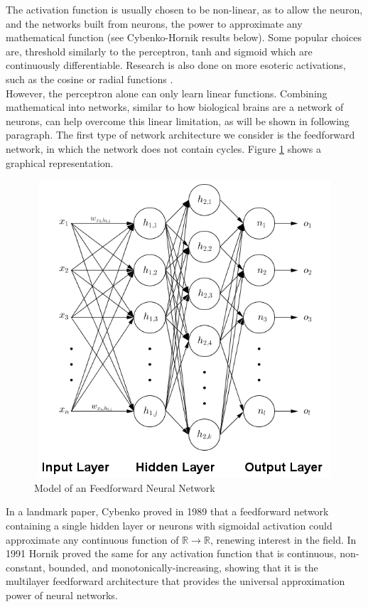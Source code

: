 \documentclass[12pt,oneside]{CUNY_CS_PhD}
\begin{document}
The activation function is usually chosen to be non-linear, as to allow the neuron, and the networks built from neurons, the power to approximate any mathematical function (see Cybenko-Hornik results below).
Some popular choices are, threshold similarly to the perceptron, tanh and sigmoid which are continuously differentiable. Research is also done on more esoteric activations, such as the cosine or radial functions \cite{lee_cosine-modulated_1996}.\\
However, the perceptron alone can only learn linear functions.  Combining mathematical into networks, similar to how biological brains are a network of neurons, can help overcome this linear limitation, as will be shown in following paragraph. The first type of network architecture we consider is the feedforward network, in which the  network does not contain cycles. Figure \ref{fig:feedforward} shows a graphical representation.\\
\begin{figure}[!htbp]
\centering
\includegraphics[keepaspectratio=false, height=11.09cm, width=12.5cm]{pictures/FeedForwardNeuralNetwork.png}
\caption{Model of an Feedforward Neural Network}
\label{fig:feedforward}
\end{figure}
\newpage
In a landmark paper, Cybenko \cite{cybenko1989approximation} proved in 1989 that a feedforward network containing a single hidden layer or neurons with sigmoidal activation could approximate any continuous function of $\mathbb{R} \rightarrow \mathbb{R}$, renewing interest in the field. In 1991 Hornik \cite{Hornik:1991} proved the same for any activation function that is continuous, non-constant, bounded, and monotonically-increasing, showing that it is the multilayer feedforward architecture that provides the universal approximation power of neural networks.
\end{document}
